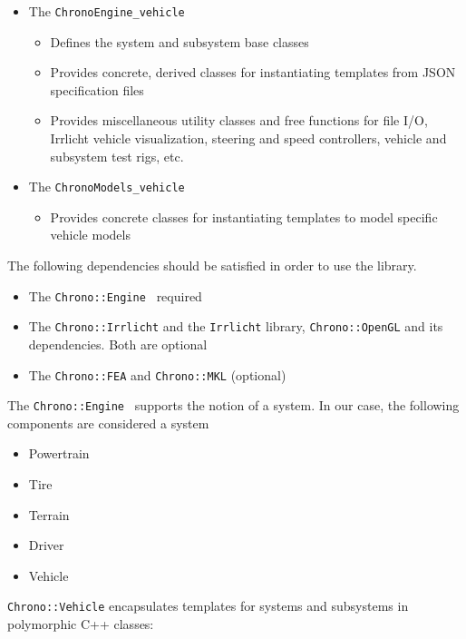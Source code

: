 \begin{itemize}
\item The \lstinline{ChronoEngine_vehicle}

	\begin{itemize}
		\item Defines the system and subsystem base classes
		\item Provides concrete, derived classes for instantiating templates from JSON specification files
		\item Provides miscellaneous utility classes and free functions for file I/O, Irrlicht vehicle visualization, steering and speed controllers, vehicle and subsystem test rigs, etc.
	\end{itemize}

\item The \lstinline{ChronoModels_vehicle}
	\begin{itemize}
		\item Provides concrete classes for instantiating templates to model specific vehicle models
	\end{itemize}
\end{itemize}

The following dependencies should be satisfied in order to use the library.

\begin{itemize}
\item The \lstinline{Chrono::Engine } required
\item The \lstinline{Chrono::Irrlicht} and the \lstinline{Irrlicht} library,  \lstinline{Chrono::OpenGL} and its dependencies. Both are optional
\item The \lstinline{Chrono::FEA} and \lstinline{Chrono::MKL} (optional)
\end{itemize}

The \lstinline{Chrono::Engine } supports the notion of a system. In our case, the following components are considered a system

\begin{itemize}
\item Powertrain
\item Tire
\item Terrain
\item Driver
\item Vehicle
\end{itemize}

\lstinline{Chrono::Vehicle} encapsulates templates for systems and subsystems in polymorphic C++ classes:

